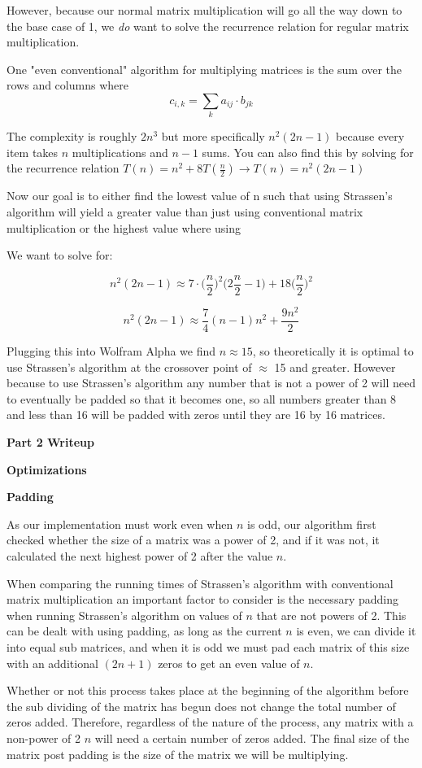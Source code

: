 \documentclass[12pt]{article}
\begin{document}
\noindent However, because our normal matrix multiplication will go all the way down to the base case of 1, we \emph{do} want to solve the recurrence relation for regular matrix multiplication.  
\medskip

\noindent One "even conventional" algorithm for multiplying matrices is the sum over the rows and columns where 
$$c_{i,k} = \sum_k a_{ij} \cdot b_{jk}$$

\noindent The complexity is roughly $2n^3$ but more specifically $n^2(2n-1)$ because every item takes $n$ multiplications and $n-1$ sums.  You can also find this by solving for the recurrence relation $T(n) = n^2 + 8T(\frac{n}{2}) \to T(n) = n^2(2n-1)$
\bigskip

\noindent Now our goal is to either find the lowest value of n such that using Strassen's algorithm will yield a greater value than just using conventional matrix multiplication or the highest value where using 
\medskip

\noindent We want to solve for:

$$n^2(2n-1) \approx 7 \cdot \bigg( \frac{n}{2}\bigg)^2\bigg(2\frac{n}{2}-1\bigg) + 18\bigg( \frac{n}{2}\bigg)^2$$

$$n^2(2n-1) \approx \frac{7}{4}(n-1)n^2 + \frac{9n^2}{2}$$

\smallskip
\noindent Plugging this into Wolfram Alpha we find $n\approx15$, so theoretically it is optimal to use Strassen's algorithm at the crossover point of $\approx$ 15 and greater.  However because to use Strassen's algorithm any number that is not a power of 2 will need to eventually be padded so that it becomes one, so all numbers greater than 8 and less than 16 will be padded with zeros until they are 16 by 16 matrices.

\bigskip

\noindent \textbf{Part 2 Writeup}
\bigskip

\noindent \textbf{Optimizations}
\bigskip

\noindent \textbf{Padding}
\medskip

\noindent As our implementation must work even when $n$ is odd, our algorithm first checked whether the size of a matrix was a power of 2, and if it was not, it calculated the next highest power of 2 after the value $n$.  
\medskip

\noindent When comparing the running times of Strassen's algorithm with conventional matrix multiplication an important factor to consider is the necessary padding when running Strassen's algorithm on values of $n$ that are not powers of 2.  This can be dealt with using padding, as long as the current $n$ is even, we can divide it into equal sub matrices, and when it is odd we must pad each matrix of this size with an additional $(2n+1)$ zeros to get an even value of $n$.
\medskip

\noindent Whether or not this process takes place at the beginning of the algorithm before the sub dividing of the matrix has begun does not change the total number of zeros added.  Therefore, regardless of the nature of the process, any matrix with a non-power of 2 $n$ will need a certain number of zeros added.  The final size of the matrix post padding is the size of the matrix we will be multiplying.
\medskip
\end{document}
